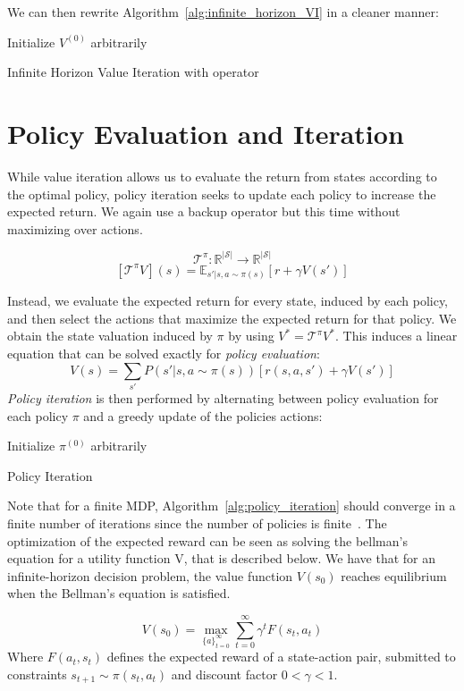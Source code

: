 \documentclass{article}
\begin{document}
We can then rewrite Algorithm~\ref{alg:infinite_horizon_VI} in a cleaner manner:
\begin{algorithm}[H]
Initialize $V^{(0)}$ arbitrarily$\;$

\SetAlgoLined
 \caption{Infinite Horizon Value Iteration with operator}
 \label{alg:finite_horizon_VI_op}
\end{algorithm}

\section{Policy Evaluation and Iteration}
While value iteration allows us to evaluate the return from states according to the optimal policy, policy iteration seeks to update each policy to increase the expected return. We again use a backup operator but this time without maximizing over actions. \\

\begin{defn}
\[
\mathcal{T}^{\pi} : \mathbb{R}^{|\mathcal{S}|}\rightarrow\mathbb{R}^{|\mathcal{S}|}
\]
\[
[\mathcal{T}^{\pi}V](s) = \mathbb{E}_{s'|s, a\sim\pi(s)}[r+\gamma V(s')]
\]
\end{defn}

Instead, we evaluate the expected return for every state, induced by each policy, and then select the actions that maximize the expected return for that policy. We obtain the state valuation induced by $\pi$ by using $V^{*}=\mathcal{T}^{\pi}V^{*}$. This induces a linear equation that can be solved exactly for \textit{policy evaluation}:
\[
V(s) = \sum_{s'}P(s'|s,a\sim\pi(s))[r(s,a,s')+\gamma V(s')]
\]
\textit{Policy iteration} is then performed by alternating between policy evaluation for each policy $\pi$ and a greedy update of the policies actions:
\begin{algorithm}[H]
Initialize $\pi^{(0)}$ arbitrarily$\;$

\SetAlgoLined
 \caption{Policy Iteration}
 \label{alg:policy_iteration}
\end{algorithm}

Note that for a finite MDP, Algorithm~\ref{alg:policy_iteration} should converge in a finite number of iterations since the number of policies is finite~\cite{sutton2011reinforcement}.
The optimization of the expected reward can be seen as solving the bellman's equation for a utility function V, that is described below. We have that for an infinite-horizon decision problem, the value function $V(s_0)$ reaches equilibrium when the Bellman's equation is satisfied.  
\begin{defn} 
\[
V(s_0) = \max_{\{a\}_{t=0}^{\infty}}{\sum_{t=0}^{\infty}\gamma^t F(s_t, a_t)}
\]
Where $F(a_t, s_t)$ defines the expected reward of a state-action pair, submitted to constraints $s_{t+1} \sim \pi(s_t,a_t)$ and discount factor $0<\gamma<1$.
\end{defn}
\end{document}
